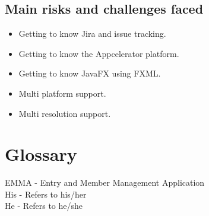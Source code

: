 \documentclass[10pt,a4paper]{article}
\begin{document}
\subsection{Main risks and challenges faced}
\begin{itemize}
\item Getting to know Jira and issue tracking.
\item Getting to know the Appcelerator platform.
\item Getting to know JavaFX using FXML.
\item Multi platform support.
\item Multi resolution support.
\end{itemize}
\section{Glossary}
EMMA - Entry and Member Management Application\\
His - Refers to his/her\\
He - Refers to he/she
\end{document}
